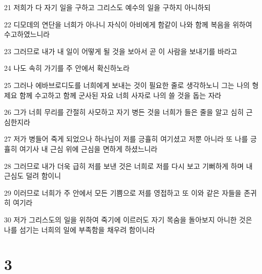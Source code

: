 \par 21 저희가 다 자기 일을 구하고 그리스도 예수의 일을 구하지 아니하되
\par 22 디모데의 연단을 너희가 아나니 자식이 아비에게 함같이 나와 함께 복음을 위하여 수고하였느니라
\par 23 그러므로 내가 내 일이 어떻게 될 것을 보아서 곧 이 사람을 보내기를 바라고
\par 24 나도 속히 가기를 주 안에서 확신하노라
\par 25 그러나 에바브로디도를 너희에게 보내는 것이 필요한 줄로 생각하노니 그는 나의 형제요 함께 수고하고 함께 군사된 자요 너희 사자로 나의 쓸 것을 돕는 자라
\par 26 그가 너희 무리를 간절히 사모하고 자기 병든 것을 너희가 들은 줄을 알고 심히 근심한지라
\par 27 저가 병들어 죽게 되었으나 하나님이 저를 긍휼히 여기셨고 저뿐 아니라 또 나를 긍휼히 여기사 내 근심 위에 근심을 면하게 하셨느니라
\par 28 그러므로 내가 더욱 급히 저를 보낸 것은 너희로 저를 다시 보고 기뻐하게 하며 내 근심도 덜려 함이니
\par 29 이러므로 너희가 주 안에서 모든 기쁨으로 저를 영접하고 또 이와 같은 자들을 존귀히 여기라
\par 30 저가 그리스도의 일을 위하여 죽기에 이르러도 자기 목숨을 돌아보지 아니한 것은 나를 섬기는 너희의 일에 부족함을 채우려 함이니라

\chapter{3}

